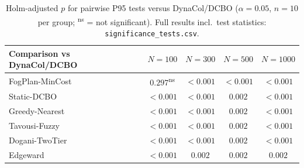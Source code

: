 \begin{table}[!t]
\centering
\caption{Holm-adjusted $p$ for pairwise P95 tests versus DynaCol/DCBO ($\alpha=0.05$, $n=10$ per group; \textsuperscript{ns} = not significant). Full results incl.\ test statistics: \texttt{significance\_tests.csv}.}
\label{tab:significance_p95}
\fgcsTableCol
\begin{tabular*}{\columnwidth}{@{\extracolsep{\fill}}@{}lcccc@{}@{}}
\toprule
\textbf{Comparison vs DynaCol/DCBO} & \textbf{$N=100$} & \textbf{$N=300$} & \textbf{$N=500$} & \textbf{$N=1000$} \\
\midrule
FogPlan-MinCost & $0.297$\textsuperscript{ns} & $<0.001$ & $<0.001$ & $<0.001$ \\
Static-DCBO & $<0.001$ & $<0.001$ & $0.002$ & $<0.001$ \\
Greedy-Nearest & $<0.001$ & $<0.001$ & $0.002$ & $<0.001$ \\
Tavousi-Fuzzy & $<0.001$ & $<0.001$ & $0.002$ & $<0.001$ \\
Dogani-TwoTier & $<0.001$ & $<0.001$ & $0.002$ & $<0.001$ \\
Edgeward & $<0.001$ & $0.002$ & $0.002$ & $0.002$ \\
\bottomrule
\end{tabular*}
\end{table}


